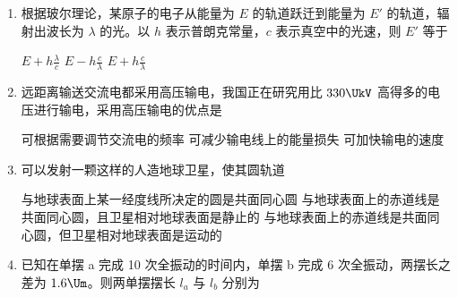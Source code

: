 \documentclass[\gkver]{gaokaozhenti}
\begin{document}
\begin{enumerate}
{与 $v$ 无关，与 $R$ 无关}
{与 $v$ 有关，与 $R$ 无关}
{与 $v$ 无关，与 $R$ 有关}


\item
根据玻尔理论，某原子的电子从能量为 $E$ 的轨道跃迁到能量为 $E'$ 的轨道，辐射出波长为 $\lambda$ 的光。以 $h$ 表示普朗克常量，$c$ 表示真空中的光速，则 $E'$ 等于 

{$E + h\frac{\lambda}{c}$}
{$E - h\frac{c}{\lambda}$}
{$E + h\frac{c}{\lambda}$}


\item
远距离输送交流电都采用高压输电，我国正在研究用比 $330\UkV$ 高得多的电压进行输电，采用高压输电的优点是 

{可根据需要调节交流电的频率}
{可减少输电线上的能量损失}
{可加快输电的速度}


\item
可以发射一颗这样的人造地球卫星，使其圆轨道 

{与地球表面上某一经度线所决定的圆是共面同心圆}
{与地球表面上的赤道线是共面同心圆，且卫星相对地球表面是静止的}
{与地球表面上的赤道线是共面同心圆，但卫星相对地球表面是运动的}


\item
已知在单摆 a 完成 10 次全振动的时间内，单摆 b 完成 6 次全振动，两摆长之差为 $1.6\Um$。则两单摆摆长 $l_{a}$ 与 $l_{b}$ 分别为 


\end{enumerate}
\end{document}
